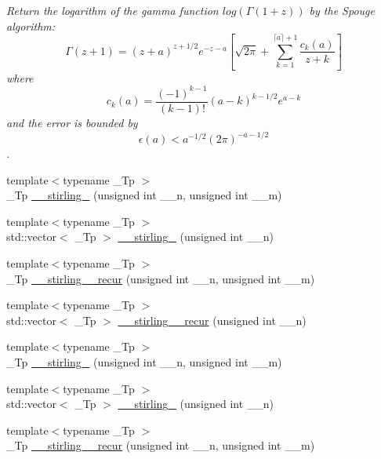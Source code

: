 \begin{DoxyCompactItemize}
\begin{DoxyCompactList}\small\item\em Return the logarithm of the gamma function $ log(\Gamma(1+z)) $ by the Spouge algorithm\+: \[ \Gamma(z+1) = (z+a)^{z+1/2}e^{-z-a}\left[ \sqrt{2\pi} + \sum_{k=1}^{\lceil a \rceil + 1}\frac{c_k(a)}{z+k}\right] \] where \[ c_k(a) = \frac{(-1)^{k-1}}{(k-1)!}(a-k)^{k-1/2}e^{a-k} \] and the error is bounded by \[ \epsilon(a) < a^{-1/2}(2\pi)^{-a-1/2} \]. \end{DoxyCompactList}\item 
{\footnotesize template$<$typename \+\_\+\+Tp $>$ }\\\+\_\+\+Tp \hyperlink{namespacestd_1_1____detail_a8b215e4ca28ec9b7b078d7f3d9aecc17}{\+\_\+\+\_\+stirling\+\_} (unsigned int \+\_\+\+\_\+n, unsigned int \+\_\+\+\_\+m)
\item 
{\footnotesize template$<$typename \+\_\+\+Tp $>$ }\\std\+::vector$<$ \+\_\+\+Tp $>$ \hyperlink{namespacestd_1_1____detail_a8d1c581fb8fddd354f7f1cbbdbe6f2d2}{\+\_\+\+\_\+stirling\+\_} (unsigned int \+\_\+\+\_\+n)
\item 
{\footnotesize template$<$typename \+\_\+\+Tp $>$ }\\\+\_\+\+Tp \hyperlink{namespacestd_1_1____detail_a0a47b5d34956a55f438f2ba079680acd}{\+\_\+\+\_\+stirling\+\_\+\_\+recur} (unsigned int \+\_\+\+\_\+n, unsigned int \+\_\+\+\_\+m)
\item 
{\footnotesize template$<$typename \+\_\+\+Tp $>$ }\\std\+::vector$<$ \+\_\+\+Tp $>$ \hyperlink{namespacestd_1_1____detail_a2fe6ac62307cb1aded6ffae4dcc81f0b}{\+\_\+\+\_\+stirling\+\_\+\_\+recur} (unsigned int \+\_\+\+\_\+n)
\item 
{\footnotesize template$<$typename \+\_\+\+Tp $>$ }\\\+\_\+\+Tp \hyperlink{namespacestd_1_1____detail_a4589d459a7a9d1d9e19b33601238a4af}{\+\_\+\+\_\+stirling\+\_} (unsigned int \+\_\+\+\_\+n, unsigned int \+\_\+\+\_\+m)
\item 
{\footnotesize template$<$typename \+\_\+\+Tp $>$ }\\std\+::vector$<$ \+\_\+\+Tp $>$ \hyperlink{namespacestd_1_1____detail_a286c6f5a5de7aa8493aa5a8bf491b26e}{\+\_\+\+\_\+stirling\+\_} (unsigned int \+\_\+\+\_\+n)
\item 
{\footnotesize template$<$typename \+\_\+\+Tp $>$ }\\\+\_\+\+Tp \hyperlink{namespacestd_1_1____detail_a23c6eb236cd8ddcfbe43e66ac23324db}{\+\_\+\+\_\+stirling\+\_\+\_\+recur} (unsigned int \+\_\+\+\_\+n, unsigned int \+\_\+\+\_\+m)

\end{DoxyCompactItemize}
